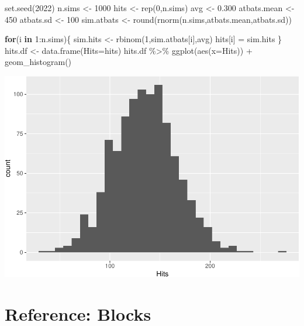\documentclass[
]{book}
\newenvironment{Shaded}{\begin{snugshade}}{\end{snugshade}}
\newcommand{\AttributeTok}[1]{\textcolor[rgb]{0.77,0.63,0.00}{#1}}
\newcommand{\ControlFlowTok}[1]{\textcolor[rgb]{0.13,0.29,0.53}{\textbf{#1}}}
\newcommand{\DecValTok}[1]{\textcolor[rgb]{0.00,0.00,0.81}{#1}}
\newcommand{\FloatTok}[1]{\textcolor[rgb]{0.00,0.00,0.81}{#1}}
\newcommand{\FunctionTok}[1]{\textcolor[rgb]{0.00,0.00,0.00}{#1}}
\newcommand{\NormalTok}[1]{#1}
\newcommand{\OtherTok}[1]{\textcolor[rgb]{0.56,0.35,0.01}{#1}}
\newcommand{\SpecialCharTok}[1]{\textcolor[rgb]{0.00,0.00,0.00}{#1}}
\theoremstyle{definition}
\theoremstyle{definition}
\theoremstyle{definition}
\theoremstyle{definition}
\theoremstyle{remark}
\begin{document}
\begin{Shaded}
\begin{Highlighting}[]
\FunctionTok{set.seed}\NormalTok{(}\DecValTok{2022}\NormalTok{)}
\NormalTok{n.sims }\OtherTok{\textless{}{-}} \DecValTok{1000}
\NormalTok{hits }\OtherTok{\textless{}{-}} \FunctionTok{rep}\NormalTok{(}\DecValTok{0}\NormalTok{,n.sims)}
\NormalTok{avg }\OtherTok{\textless{}{-}} \FloatTok{0.300}
\NormalTok{atbats.mean }\OtherTok{\textless{}{-}} \DecValTok{450}
\NormalTok{atbats.sd }\OtherTok{\textless{}{-}} \DecValTok{100}
\NormalTok{sim.atbats }\OtherTok{\textless{}{-}} \FunctionTok{round}\NormalTok{(}\FunctionTok{rnorm}\NormalTok{(n.sims,atbats.mean,atbats.sd))}

\ControlFlowTok{for}\NormalTok{(i }\ControlFlowTok{in} \DecValTok{1}\SpecialCharTok{:}\NormalTok{n.sims)\{}
\NormalTok{  sim.hits }\OtherTok{\textless{}{-}} \FunctionTok{rbinom}\NormalTok{(}\DecValTok{1}\NormalTok{,sim.atbats[i],avg)}
\NormalTok{  hits[i] }\OtherTok{=}\NormalTok{ sim.hits}
\NormalTok{\}}
\NormalTok{hits.df }\OtherTok{\textless{}{-}} \FunctionTok{data.frame}\NormalTok{(}\AttributeTok{Hits=}\NormalTok{hits)}
\NormalTok{hits.df }\SpecialCharTok{\%\textgreater{}\%} \FunctionTok{ggplot}\NormalTok{(}\FunctionTok{aes}\NormalTok{(}\AttributeTok{x=}\NormalTok{Hits)) }\SpecialCharTok{+} \FunctionTok{geom\_histogram}\NormalTok{()}
\end{Highlighting}
\end{Shaded}

\includegraphics{series_files/figure-latex/baseball-sim-1.pdf}

\hypertarget{reference-blocks}{%
\chapter*{Reference: Blocks}\label{reference-blocks}}
\end{document}
